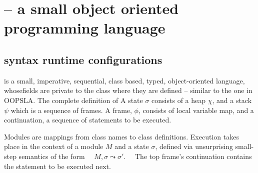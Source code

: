\section{\LangOO -- a small  object oriented programming language}

\subsection{\LangOO syntax runtime configurations}
\label{sub:Loo} 
 \LangOO  is a {small}, imperative, sequential,  class based, typed, object-oriented language, whosefields are private to the class where they are defined -- similar to the one in OOPSLA.
The complete definition of 
A \LangOO state $\sigma$ consists of a  heap $\chi$, and a  {stack $\psi$ which is a sequence of frames}.
A frame, $\phi$, consists of local variable map, and a continuation, \ie a sequence of statements to be executed.
 
Modules are mappings from class names to class definitions. 
Execution takes place in the context of  a module $M$ and   a state $\sigma$, defined via unsurprising small-step semantics of the form \ \ 
   $M, \sigma \leadsto \sigma'$. \ \
The   top frame's continuation contains the statement to be  executed next.  

